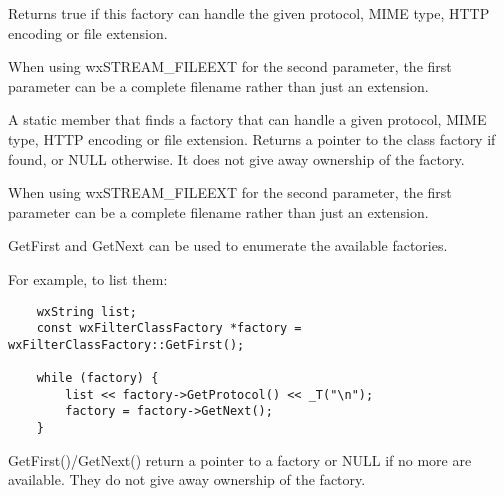 \label{wxfilterclassfactorycanhandle}


Returns true if this factory can handle the given protocol, MIME type, HTTP
encoding or file extension.

When using wxSTREAM\_FILEEXT for the second parameter, the first parameter
can be a complete filename rather than just an extension.


\label{wxfilterclassfactoryfind}


A static member that finds a factory that can handle a given protocol, MIME
type, HTTP encoding or file extension.  Returns a pointer to the class
factory if found, or NULL otherwise. It does not give away ownership of the
factory.

When using wxSTREAM\_FILEEXT for the second parameter, the first parameter
can be a complete filename rather than just an extension.


\label{wxfilterclassfactorygetfirst}



GetFirst and GetNext can be used to enumerate the available factories.

For example, to list them:

\begin{verbatim}
    wxString list;
    const wxFilterClassFactory *factory = wxFilterClassFactory::GetFirst();

    while (factory) {
        list << factory->GetProtocol() << _T("\n");
        factory = factory->GetNext();
    }

\end{verbatim}

GetFirst()/GetNext() return a pointer to a factory or NULL if no more
are available. They do not give away ownership of the factory.


\label{wxfilterclassfactorygetprotocol}


